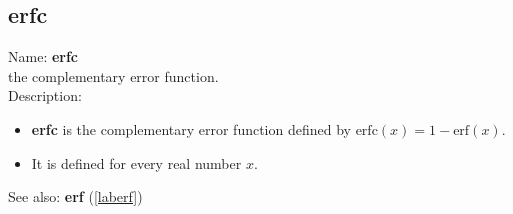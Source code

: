 \subsection{erfc}
\label{laberfc}
\noindent Name: \textbf{erfc}\\
the complementary error function.\\
\noindent Description: \begin{itemize}

\item \textbf{erfc} is the complementary error function defined by $\mathrm{erfc}(x) = 1 - \mathrm{erf}(x)$.

\item It is defined for every real number $x$.
\end{itemize}
See also: \textbf{erf} (\ref{laberf})
